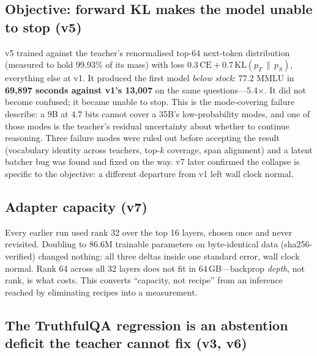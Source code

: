 \documentclass[11pt]{article}
\begin{document}
\subsection{Objective: forward KL makes the model unable to stop (v5)}
\label{sec:v5}

v5 trained against the teacher's renormalised top-64 next-token distribution
(measured to hold 99.93\% of its mass) with loss
$0.3\,\mathrm{CE} + 0.7\,\mathrm{KL}(p_T \,\|\, p_S)$, everything else at v1.  It
produced the first model \emph{below stock}: 77.2 MMLU in \textbf{69{,}897
seconds against v1's 13{,}007} on the same questions---5.4$\times$.  It did not
become confused; it became unable to stop.  This is the mode-covering failure
\citet{gu2023minillm} describe: a 9B at 4.7 bits cannot cover a 35B's
low-probability modes, and one of those modes is the teacher's residual
uncertainty about whether to continue reasoning.  Three failure modes were ruled
out before accepting the result (vocabulary identity across teachers, top-$k$
coverage, span alignment) and a latent batcher bug was found and fixed on the
way.  v7 later confirmed the collapse is specific to the objective: a different
departure from v1 left wall clock normal.

\subsection{Adapter capacity (v7)}

Every earlier run used rank 32 over the top 16 layers, chosen once and never
revisited.  Doubling to 86.6M trainable parameters on byte-identical data
(sha256-verified) changed nothing: all three deltas inside one standard error,
wall clock normal.  Rank 64 across all 32 layers does not fit in 64\,GB---backprop
\emph{depth}, not rank, is what costs.  This converts ``capacity, not recipe''
from an inference reached by eliminating recipes into a measurement.

\subsection{The TruthfulQA regression is an abstention deficit the teacher cannot fix (v3, v6)}
\label{sec:truthfulqa}
\end{document}
